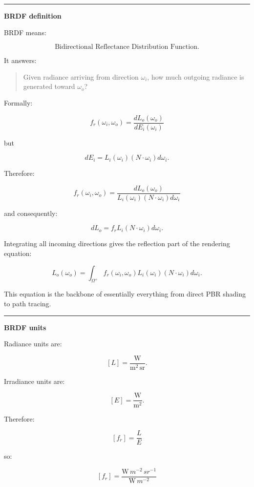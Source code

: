 \begin{center}\rule{0.5\linewidth}{0.5pt}\end{center}

\textbf{BRDF definition}

BRDF means:

\[
\text{Bidirectional Reflectance Distribution Function}.
\]

It answers:

\begin{quote}
Given radiance arriving from direction \(\omega_i\), how much outgoing radiance is generated toward \(\omega_o\)?
\end{quote}

Formally:

\[
\boxed{
f_r(\omega_i,\omega_o)
=
\frac{dL_o(\omega_o)}
{dE_i(\omega_i)}
}
\]

but

\[
dE_i
=
L_i(\omega_i)
(N\cdot\omega_i)
d\omega_i.
\]

Therefore:

\[
\boxed{
f_r(\omega_i,\omega_o)
=
\frac{
dL_o(\omega_o)
}{
L_i(\omega_i)
(N\cdot\omega_i)
d\omega_i
}
}
\]

and consequently:

\[
dL_o
=
f_r
L_i
(N\cdot\omega_i)
d\omega_i.
\]

Integrating all incoming directions gives the reflection part of the rendering equation:

\[
\boxed{
L_o(\omega_o)
=
\int_{\Omega^+}
f_r(\omega_i,\omega_o)
L_i(\omega_i)
(N\cdot\omega_i)
d\omega_i.
}
\]

This equation is the backbone of essentially everything from direct PBR shading to path tracing.

\begin{center}\rule{0.5\linewidth}{0.5pt}\end{center}

\textbf{BRDF units}

Radiance units are:

\[
[L]
=
\frac{\mathrm W}
{\mathrm{m^2\,sr}}.
\]

Irradiance units are:

\[
[E]
=
\frac{\mathrm W}{\mathrm{m^2}}.
\]

Therefore:

\[
[f_r]
=
\frac{L}{E}
\]

so:

\[
[f_r]
=
\frac{
\mathrm W\,m^{-2}\,sr^{-1}
}{
\mathrm W\,m^{-2}
}
\]

